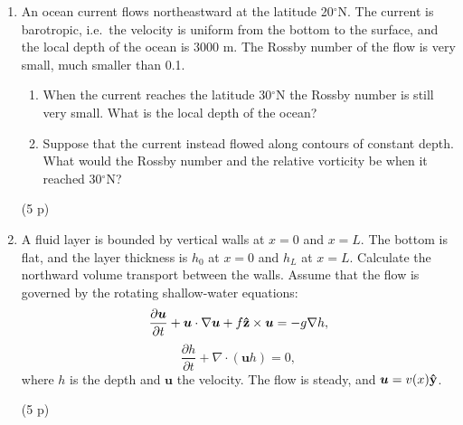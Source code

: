 \documentclass[12pt,a4paper]{article}
\newcommand{\bu}{\bm{u}}
\newcommand{\hy}{{\bf\hat{y}}}
\newcommand{\hz}{{\bf\hat{z}}}
\begin{document}
\begin{enumerate}
(5 p)\\
\item An ocean current flows northeastward at the latitude 20$^\circ$N. The current is 
barotropic, i.e.\ the velocity is uniform from the bottom to the surface, and the local
depth of the ocean is 3000 m. The Rossby number of the flow is very small, much smaller than 0.1.
\begin{enumerate}
 \item When the current reaches the latitude 30$^\circ$N the Rossby number is still very small.
 What is the local depth of the ocean?
 \item Suppose that the current instead flowed along contours of constant depth.
 What would the Rossby number and the relative vorticity be when it reached 30$^\circ$N?
\end{enumerate}

(5 p)\\
\item
A fluid layer  is bounded by vertical walls at $x = 0$ and $x = L$. The bottom is flat, and the 
layer thickness is $h_{0}$ at $x = 0$ and $h_{L}$ at $x = L$. Calculate the northward 
volume transport between the walls. Assume that the flow is governed by the rotating 
shallow-water equations:
$$  
\frac{\partial \bu}{\partial t}+\bu\cdot\nabla\bu+f\hz\times\bu
= -g\nabla h,
$$
$$
\frac{\partial h}{\partial t}+\nabla\cdot(\bu h) = 0,
$$
where $h$ is the depth and $\bu$ the velocity. The flow is steady, and $\bu = v(x)\hy$.
  
(5 p)\\

\end{enumerate}
\end{document}
